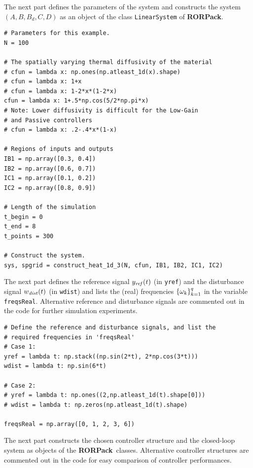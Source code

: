 \documentclass[11pt, a4paper]{amsart}
\theoremstyle{definition}
\numberwithin{equation}{section}
\newcommand{\yref}{y_{\mbox{\scriptsize\textit{ref}}}}
\newcommand{\wdist}{w_{\mbox{\scriptsize\textit{dist}}}}
\newcommand{\RORname}{\textbf{RORPack}}
\begin{document}
 The next part defines the parameters of the system and constructs the system $(A,B,B_d,C,D)$ as an object of the class \texttt{LinearSystem} of \RORname.

\begin{lstlisting}
# Parameters for this example.
N = 100

# The spatially varying thermal diffusivity of the material
# cfun = lambda x: np.ones(np.atleast_1d(x).shape)
# cfun = lambda x: 1+x
# cfun = lambda x: 1-2*x*(1-2*x)
cfun = lambda x: 1+.5*np.cos(5/2*np.pi*x)
# Note: Lower diffusivity is difficult for the Low-Gain
# and Passive controllers
# cfun = lambda x: .2-.4*x*(1-x)

# Regions of inputs and outputs
IB1 = np.array([0.3, 0.4])
IB2 = np.array([0.6, 0.7])
IC1 = np.array([0.1, 0.2])
IC2 = np.array([0.8, 0.9])

# Length of the simulation
t_begin = 0
t_end = 8
t_points = 300

# Construct the system.
sys, spgrid = construct_heat_1d_3(N, cfun, IB1, IB2, IC1, IC2)
  \end{lstlisting}

The next part defines the reference signal $\yref(t)$ (in \texttt{yref}) and the disturbance signal $\wdist(t)$ (in \texttt{wdist}) and lists the (real) frequencies $\{\omega_k\}_{k=1}^q$ in the variable \texttt{freqsReal}. Alternative reference and disturbance signals are commented out in the code for further simulation experiments.

\begin{lstlisting}
# Define the reference and disturbance signals, and list the
# required frequencies in 'freqsReal'
# Case 1:
yref = lambda t: np.stack((np.sin(2*t), 2*np.cos(3*t)))
wdist = lambda t: np.sin(6*t)

# Case 2:
# yref = lambda t: np.ones((2,np.atleast_1d(t).shape[0]))
# wdist = lambda t: np.zeros(np.atleast_1d(t).shape)

freqsReal = np.array([0, 1, 2, 3, 6])
\end{lstlisting}

The next part constructs the chosen controller structure and the closed-loop system as objects of the \RORname\ classes. Alternative controller structures are commented out in the code for easy comparison of controller performances.
\end{document}
